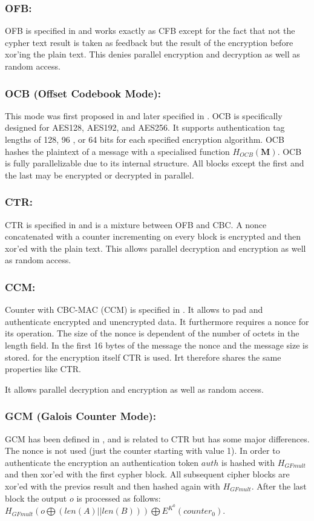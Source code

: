 \subsubsection{OFB:} OFB is specified in \cite{dworkin2001recommendation} and works exactly as CFB except for the fact that not the cypher text result is taken as feedback but the result of the encryption before xor'ing the plain text. This denies parallel encryption and decryption as well as random access.

\subsubsection{OCB (Offset Codebook Mode):} This mode was first proposed in \cite{rogaway2003ocb} and later specified in \cite{krovetz-ocb-04}. OCB is specifically designed for AES128, AES192, and AES256. It supports authentication tag lengths of 128, 96 , or 64 bits for each specified encryption algorithm. OCB hashes the plaintext of a message with a specialised function $H_{OCB}(\mathbf{M})$. OCB is fully parallelizable due to its internal structure. All blocks except the first and the last may be encrypted or decrypted in parallel.


\subsubsection{CTR:} CTR is specified in \cite{lipmaa2000ctr} and is a mixture between OFB and CBC. A nonce concatenated with a counter incrementing on every block is encrypted and then xor'ed with the plain text. This allows parallel decryption and encryption as well as random access.

\subsubsection{CCM:} Counter with CBC-MAC (CCM) is specified in \cite{RFC3610}. It allows to pad and authenticate encrypted and unencrypted data. It furthermore requires a nonce for its operation. The size of the nonce is dependent of the number of octets in the length field. In the first 16 bytes of the message the nonce and the message size is stored. for the encryption itself CTR is used. Irt therefore shares the same properties like CTR. 

It allows parallel decryption and encryption as well as random access.

\subsubsection{GCM (Galois Counter Mode):} GCM has been defined in \cite{mcgrew2004galois}, and is related to CTR but has some major differences. The nonce is not used (just the counter starting with value 1). In order to authenticate the encryption an authentication token $auth$ is hashed with $H_{GFmult}$ and then xor'ed with the first cypher block. All subsequent cipher blocks are xor'ed with the previos result and then hashed  again with $H_{GFmult}$. After the last block the output $o$ is processed  as follows: $H_{GFmult}(o\bigoplus (len(A)||len(B))) \bigoplus E^{K^0}(counter_0)$. 

